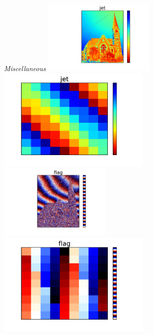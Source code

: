 \documentclass{beamer}
\begin{document}
\begin{frame}
\begin{columns}
\begin{column}{0.5\textwidth}
\begin{center}
\textit{Miscellaneous}
\vfill
\includegraphics[width=0.42\textwidth]{../church_jet.pdf}
\includegraphics[width=0.58\textwidth]{../magicsquare_jet.pdf}\newline\newline
\vfill
\includegraphics[width=0.42\textwidth]{../church_flag.pdf}
\includegraphics[width=0.58\textwidth]{../magicsquare_flag.pdf}
\vfill
\end{center}
\end{column}
\begin{column}{0.5\textwidth}

\end{column}
\end{columns}
\end{frame}
\end{document}
